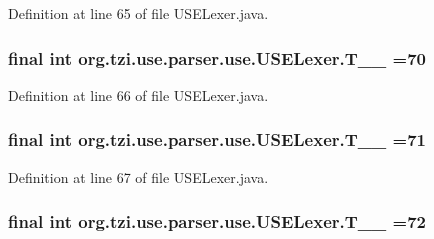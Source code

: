 Definition at line 65 of file U\-S\-E\-Lexer.\-java.

\hypertarget{classorg_1_1tzi_1_1use_1_1parser_1_1use_1_1_u_s_e_lexer_ac520a5bdecffdeb9e88e51a235b4c293}{
\subsubsection[{T\-\_\-\-\_\-70}]{\setlength{\rightskip}{0pt plus 5cm}final int org.\-tzi.\-use.\-parser.\-use.\-U\-S\-E\-Lexer.\-T\-\_\-\-\_ =70\hspace{0.3cm}{\ttfamily [static]}}}\label{classorg_1_1tzi_1_1use_1_1parser_1_1use_1_1_u_s_e_lexer_ac520a5bdecffdeb9e88e51a235b4c293}


Definition at line 66 of file U\-S\-E\-Lexer.\-java.

\hypertarget{classorg_1_1tzi_1_1use_1_1parser_1_1use_1_1_u_s_e_lexer_a579c84078965982b13fc94e2da6cb5a7}{
\subsubsection[{T\-\_\-\-\_\-71}]{\setlength{\rightskip}{0pt plus 5cm}final int org.\-tzi.\-use.\-parser.\-use.\-U\-S\-E\-Lexer.\-T\-\_\-\-\_ =71\hspace{0.3cm}{\ttfamily [static]}}}\label{classorg_1_1tzi_1_1use_1_1parser_1_1use_1_1_u_s_e_lexer_a579c84078965982b13fc94e2da6cb5a7}


Definition at line 67 of file U\-S\-E\-Lexer.\-java.

\hypertarget{classorg_1_1tzi_1_1use_1_1parser_1_1use_1_1_u_s_e_lexer_a3d65f095d5f655f566d6472732626c43}{
\subsubsection[{T\-\_\-\-\_\-72}]{\setlength{\rightskip}{0pt plus 5cm}final int org.\-tzi.\-use.\-parser.\-use.\-U\-S\-E\-Lexer.\-T\-\_\-\-\_ =72\hspace{0.3cm}{\ttfamily [static]}}}\label{classorg_1_1tzi_1_1use_1_1parser_1_1use_1_1_u_s_e_lexer_a3d65f095d5f655f566d6472732626c43}



